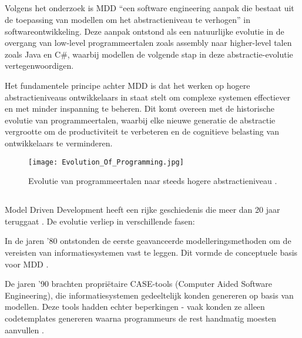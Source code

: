 \subsection{}%

Volgens het onderzoek \textcite{Hailpern2006} is MDD “een software engineering aanpak die bestaat uit de toepassing van modellen om het abstractieniveau te verhogen” in softwareontwikkeling. Deze aanpak ontstond als een natuurlijke evolutie in de overgang van low-level programmeertalen zoals assembly naar higher-level talen zoals Java en C\#, waarbij modellen de volgende stap in deze abstractie-evolutie vertegenwoordigen.

Het fundamentele principe achter MDD is dat het werken op hogere abstractieniveaus ontwikkelaars in staat stelt om complexe systemen effectiever en met minder inspanning te beheren. Dit komt overeen met de historische evolutie van programmeertalen, waarbij elke nieuwe generatie de abstractie vergrootte om de productiviteit te verbeteren en de cognitieve belasting van ontwikkelaars te verminderen.

\begin{figure}[H]
    \centering
    \texttt{[image: Evolution\_Of\_Programming.jpg]}
    \caption[Evolution]{\label{fig:evolution} Evolutie van programmeertalen naar steeds hogere abstractieniveau \autocite{Sufi_2023}.}
\end{figure}


\subsection{}%
Model Driven Development heeft een rijke geschiedenis die meer dan 20 jaar teruggaat \autocite{Henkel2010}. De evolutie verliep in verschillende fasen:

In de jaren '80 ontstonden de eerste geavanceerde modelleringsmethoden om de vereisten van informatiesystemen vast te leggen. Dit vormde de conceptuele basis voor MDD \autocite{Henkel2010}.

De jaren '90 brachten propriëtaire CASE-tools (Computer Aided Software Engineering), die informatiesystemen gedeeltelijk konden genereren op basis van modellen. Deze tools hadden echter beperkingen - vaak konden ze alleen codetemplates genereren waarna programmeurs de rest handmatig moesten aanvullen \autocite{Case_1985}.

